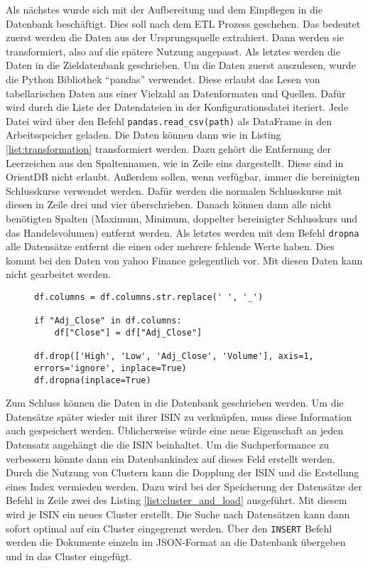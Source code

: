 Als nächstes wurde sich mit der Aufbereitung und dem Einpflegen in die Datenbank beschäftigt. Dies soll nach dem \gls{ETL} Prozess geschehen. Das bedeutet zuerst werden die Daten aus der Ursprungsquelle extrahiert. Dann werden sie transformiert, also auf die spätere Nutzung angepasst. Als letztes werden die Daten in die Zieldatenbank geschrieben. Um die Daten zuerst auszulesen, wurde die Python Bibliothek \enquote{pandas} verwendet. Diese erlaubt das Lesen von tabellarischen Daten aus einer Vielzahl an Datenformaten und Quellen. Dafür wird durch die Liste der Datendateien in der Konfigurationsdatei iteriert. Jede Datei wird über den Befehl \texttt{pandas.read\_csv(path)} als DataFrame in den Arbeitsspeicher geladen. Die Daten können dann wie in Listing \ref{list:transformation} transformiert werden. Dazu gehört die Entfernung der Leerzeichen aus den Spaltennamen, wie in Zeile eins dargestellt. Diese sind in OrientDB nicht erlaubt. Außerdem sollen, wenn verfügbar, immer die bereinigten Schlusskurse verwendet werden. Dafür werden die normalen Schlusskurse mit diesen in Zeile drei und vier überschrieben. Danach können dann alle nicht benötigten Spalten (Maximum, Minimum, doppelter bereinigter Schlusskurs und das Handelsvolumen) entfernt werden. Als letztes werden mit dem Befehl \texttt{dropna} alle Datensätze entfernt die einen oder mehrere fehlende Werte haben. Dies kommt bei den Daten von yahoo Finance gelegentlich vor. Mit diesen Daten kann nicht gearbeitet werden.

\begin{figure}[!htb]
    \begin{lstlisting}[caption=Transformation eines DataFrames, label=list:transformation]
df.columns = df.columns.str.replace(' ', '_')

if "Adj_Close" in df.columns:
    df["Close"] = df["Adj_Close"]

df.drop(['High', 'Low', 'Adj_Close', 'Volume'], axis=1, errors='ignore', inplace=True)
df.dropna(inplace=True)
    \end{lstlisting}
\end{figure}

Zum Schluss können die Daten in die Datenbank geschrieben werden. Um die Datensätze später wieder mit ihrer \gls{ISIN} zu verknüpfen, muss diese Information auch gespeichert werden. Üblicherweise würde eine neue Eigenschaft an jeden Datensatz angehängt die die \gls{ISIN} beinhaltet. Um die Suchperformance zu verbessern könnte dann ein Datenbankindex auf dieses Feld erstellt werden. Durch die Nutzung von Clustern kann die Dopplung der \gls{ISIN} und die Erstellung eines Index vermieden werden. Dazu wird bei der Speicherung der Datensätze der Befehl in Zeile zwei des Listing \ref{list:cluster_and_load} ausgeführt. Mit diesem wird je \gls{ISIN} ein neues Cluster erstellt. Die Suche nach Datensätzen kann dann sofort optimal auf ein Cluster eingegrenzt werden. Über den \texttt{INSERT} Befehl werden die Dokumente einzeln im \gls{JSON}-Format an die Datenbank übergeben und in das Cluster eingefügt.


